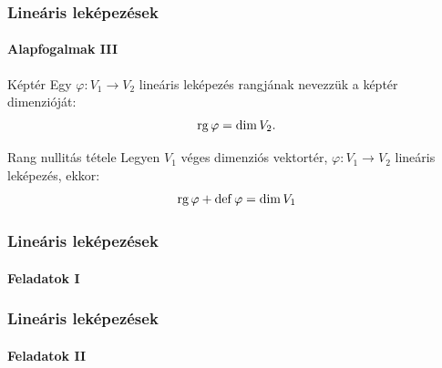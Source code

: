 \documentclass[xcolor={table}]{beamer}
\begin{document}
\begin{frame}
  \frametitle{Lineáris leképezések}
  \framesubtitle{Alapfogalmak III}

  \vfill
  \begin{block}{Képtér}
    Egy $\varphi: V_1 \rightarrow V_2$ lineáris leképezés rangjának nevezzük
    a képtér dimenzióját:
    \[
      \operatorname{rg} \varphi = \operatorname{dim} V_2
      \text.
    \]
  \end{block}
  \vfill
  \begin{block}{Rang nullitás tétele}
    Legyen $V_1$ véges dimenziós vektortér, $\varphi: V_1 \rightarrow V_2$
    lineáris leképezés, ekkor:
    \[
      \operatorname{rg} \varphi + \operatorname{def} \varphi = \operatorname{dim} V_1
    \]
  \end{block}
  \vfill
\end{frame}

\begin{frame}
  \frametitle{Lineáris leképezések}
  \framesubtitle{Feladatok I}

  
\end{frame}

\begin{frame}
  \frametitle{Lineáris leképezések}
  \framesubtitle{Feladatok II}

  
\end{frame}
\end{document}

